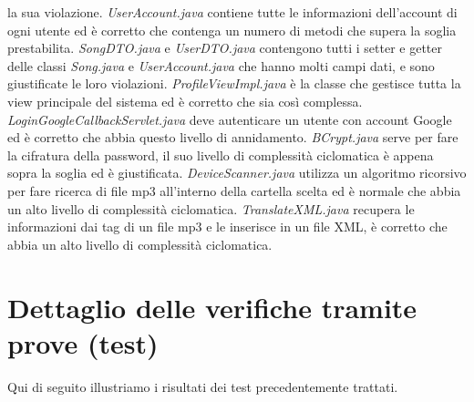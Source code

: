 la sua violazione. \emph{UserAccount.java} contiene tutte le
informazioni dell'account di ogni utente ed \`e corretto che contenga un numero
di metodi che supera la soglia prestabilita. \emph{SongDTO.java} e
\emph{UserDTO.java} contengono tutti i setter e getter delle classi
\emph{Song.java} e \emph{UserAccount.java} che hanno molti campi dati, e sono
giustificate le loro violazioni. \emph{ProfileViewImpl.java} \`e la classe che
gestisce tutta la view principale del sistema ed \`e corretto che sia cos\`i
complessa. \emph{LoginGoogleCallbackServlet.java} deve autenticare un utente con
account Google ed \`e corretto che abbia questo livello di annidamento.
\emph{BCrypt.java} serve per fare la cifratura della password, il suo livello di
complessit\`a ciclomatica \`e appena sopra la soglia ed \`e giustificata.
\emph{DeviceScanner.java} utilizza un algoritmo ricorsivo per fare ricerca di
file mp3 all'interno della cartella scelta ed \`e normale che abbia un
alto livello di complessit\`a ciclomatica. \emph{TranslateXML.java}
recupera le informazioni dai tag di un file mp3 e le inserisce in un file XML,
\`e corretto che abbia un alto livello di complessit\`a ciclomatica.

\section{Dettaglio delle verifiche tramite prove (test)}
Qui di seguito illustriamo i risultati dei test precedentemente trattati.
